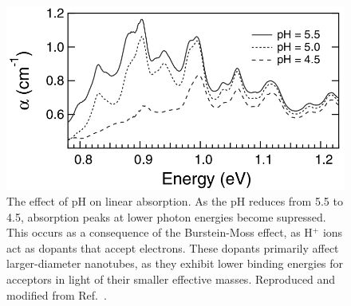 \begin{figure}[H]
	\centering
	\includegraphics[scale=1.5]{images/chapter_prior_works/ph_effect_gordana_revised}
	\caption{The effect of pH on linear absorption. As the pH reduces from 5.5 to 4.5, absorption peaks at lower photon energies become supressed. This occurs as a consequence of the Burstein-Moss effect, as H$^+$ ions act as dopants that accept electrons. These dopants primarily affect larger-diameter nanotubes, as they exhibit lower binding energies for acceptors in light of their smaller effective masses. Reproduced and modified from Ref.\ \cite{ostojic2004interband}.}
	\label{fig:ph_abs_gordana}
\end{figure}

